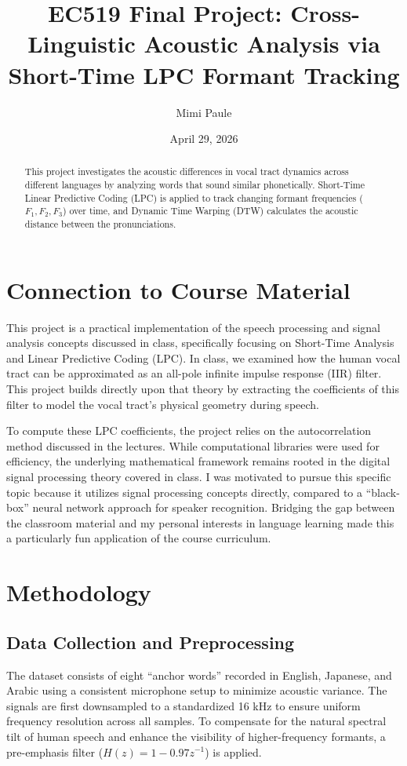 \documentclass[11pt, letterpaper]{article}
\title{\singlespacing \vspace{-2cm}EC519 Final Project: Cross-Linguistic Acoustic Analysis via Short-Time LPC Formant Tracking}
\author{Mimi Paule}
\date{April 29, 2026}
\begin{document}
\maketitle

\begin{abstract}
This project investigates the acoustic differences in vocal tract dynamics across different languages by analyzing words that sound similar phonetically. Short-Time Linear Predictive Coding (LPC) is applied to track changing formant frequencies ($F_1, F_2, F_3$) over time, and Dynamic Time Warping (DTW) calculates the acoustic distance between the pronunciations.
\end{abstract}

\section{Connection to Course Material}
This project is a practical implementation of the speech processing and signal analysis concepts discussed in class, specifically focusing on Short-Time Analysis and Linear Predictive Coding (LPC). 
In class, we examined how the human vocal tract can be approximated as an all-pole infinite impulse response (IIR) filter. 
This project builds directly upon that theory by extracting the coefficients of this filter to model the vocal tract's physical geometry during speech.

To compute these LPC coefficients, the project relies on the autocorrelation method discussed in the lectures. While computational libraries were used for efficiency, the underlying mathematical framework remains rooted in the digital signal processing theory covered in class. 
I was motivated to pursue this specific topic because it utilizes signal processing concepts directly, compared to a ``black-box'' neural network approach for speaker recognition. 
Bridging the gap between the classroom material and my personal interests in language learning made this a particularly fun application of the course curriculum.

\section{Methodology}

\subsection{Data Collection and Preprocessing}
The dataset consists of eight ``anchor words'' recorded in English, Japanese, and Arabic using a consistent microphone setup to minimize acoustic variance. The signals are first downsampled to a standardized 16 kHz to ensure uniform frequency resolution across all samples. To compensate for the natural spectral tilt of human speech and enhance the visibility of higher-frequency formants, a pre-emphasis filter ($H(z) = 1 - 0.97z^{-1}$) is applied. 
\end{document}

